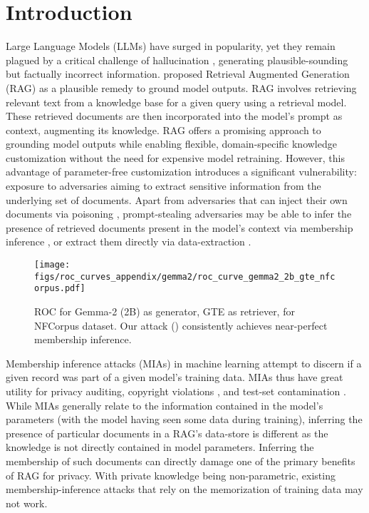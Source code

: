 \section{Introduction}
\label{sec:introduction}



Large Language Models (LLMs) have surged in popularity, yet they remain plagued by a critical challenge of hallucination \citep{ji2023survey}, generating plausible-sounding but factually incorrect information. \citet{lewis2020retrieval} proposed Retrieval Augmented Generation (RAG) as a plausible remedy to ground model outputs. RAG involves retrieving relevant text from a knowledge base for a given query using a retrieval model. These retrieved documents are then incorporated into the model's prompt as context, augmenting its knowledge. RAG offers a promising approach to grounding model outputs while enabling flexible, domain-specific knowledge customization without the need for expensive model retraining.
However, this advantage of parameter-free customization introduces a significant vulnerability: exposure to adversaries aiming to extract sensitive information from the underlying set of documents. Apart from adversaries that can inject their own documents via poisoning \citep{chaudhari2024phantom}, prompt-stealing adversaries \citep{hui2024pleak} may be able to infer the presence of retrieved documents present in the model's context via membership inference \citep{shokri2017membership}, or extract them directly via data-extraction \citep{carlini2021extracting}.

\begin{figure}[t!]
    \centering
    \texttt{[image: figs/roc\_curves\_appendix/gemma2/roc\_curve\_gemma2\_2b\_gte\_nfcorpus.pdf]}
    \caption{ROC for Gemma-2 (2B) as generator, GTE as retriever, for NFCorpus dataset. Our attack (\ourattack) consistently achieves near-perfect membership inference.}
    \label{fig:roc_maintext_example}
\end{figure}

Membership inference attacks (MIAs) in machine learning attempt to discern if a given record was part of a given model's training data. MIAs thus have great utility for privacy auditing, copyright violations \citep{maini2024llm}, and test-set contamination \citep{oren2024proving}. While MIAs generally relate to the information contained in the model's parameters (with the model having seen some data during training), inferring the presence of particular documents in a RAG's data-store is different as the knowledge is not directly contained in model parameters. Inferring the membership of such documents can directly damage one of the primary benefits of RAG for privacy. With private knowledge being non-parametric, existing membership-inference attacks that rely on the memorization of training data may not work.

